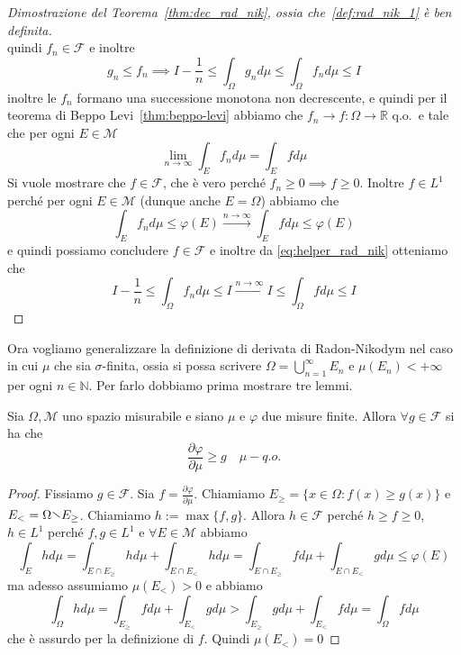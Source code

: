 \begin{proof}[Dimostrazione del Teorema~\ref{thm:dec_rad_nik}, ossia
    che~\ref{def:rad_nik_1} è ben definita]
\[    \]
    quindi \(f_{n} \in \mathcal{F}\) e inoltre 
    \begin{equation}\label{eq:helper_rad_nik}
         g_{n} \le f_{n} \implies I - \frac{1}{n} \le \int_\Omega g_{n} d\mu \le \int_\Omega f_{n}
        d\mu \le I
    \end{equation}
    inoltre le \(f_{n}\) formano una successione monotona non decrescente, e
    quindi per il teorema di Beppo Levi~\ref{thm:beppo-levi} abbiamo che \(f_{n}
    \to f : \Omega \to \mathbb{R}\) q.o.~e tale che per ogni \(E \in \mathcal{M} \) 
    \[
        \lim_{n \to \infty} \int_E f_{n} d\mu = \int_E f d\mu
    \]
    Si vuole mostrare che \(f \in \mathcal{F}\), che è
    vero perché \(f_{n} \ge 0 \implies f \ge 0\). Inoltre \(f \in L^{1}\) perché
    per ogni \(E \in \mathcal{M}\) (dunque anche \(E = \Omega\)) abbiamo che
    \[
        \int_E f_{n} d\mu \le \varphi {(E)} \overset{n \to
        \infty}{\longrightarrow} \int_E f d\mu \le \varphi {(E)}
    \]
    e quindi possiamo concludere \(f \in \mathcal{F}\) e inoltre da
    \eqref{eq:helper_rad_nik} otteniamo che
    \[
        I - \frac{1}{n} \le \int_\Omega f_{n} d\mu \le I
        \overset{n \to \infty}{\longrightarrow}I \le \int_\Omega f d\mu \le I
    \]
\end{proof}
Ora vogliamo generalizzare la definizione di derivata di Radon-Nikodym nel caso in cui
\(\mu\) che sia \(\sigma\)-finita, ossia si possa scrivere \(\Omega = \bigcup_{n=1}^{\infty}
E_{n}\) e \(\mu(E_{n}) < +\infty\) per ogni \(n \in \mathbb{N}\). Per farlo
dobbiamo prima mostrare tre lemmi.
\begin{lemma}\label{lem:rad_nik_1}
    Sia \(\Omega, \mathcal{M}\) uno spazio misurabile e siano \(\mu\) e
    \(\varphi \) due misure finite. Allora \(\forall g \in \mathcal{F}\) si ha
    che
    \[
        \frac{\partial \varphi}{\partial \mu} \ge g \quad \mu-q.o.
    \]
\end{lemma}
\begin{proof}
    Fissiamo \(g \in \mathcal{F}\). Sia \(f = \frac{\partial \varphi}{\partial \mu}\). Chiamiamo \(E_{\ge } = \{x \in \Omega :
    f {(x )} \ge g{(x)}\} \) e \(E_< = \Omega
    \sminus E_{\ge }  \). Chiamiamo \(h := \max \{f,
    g\} \). Allora \(h \in \mathcal{F}\) perché \(h \ge f\ge 0\), \(h \in
    L^{1}\) perché \(f, g \in L^{1}\) e \(\forall E \in \mathcal{M}\) abbiamo
    \[
        \int_E h d\mu = \int_{E \cap E_{\ge }} h d\mu + \int_{E \cap E_{<}} h
        d\mu = \int_{E \cap E_{\ge }} f d\mu + \int_{E \cap E_{<}} g d\mu \le \varphi
        {(E)}
    \]
    ma adesso assumiamo \(\mu{(E_<)} > 0\) e abbiamo
    \[
        \int_\Omega h d\mu = \int_{E_{\ge }} f d\mu + \int_{E_{<}} g d\mu >
        \int_{E_{\ge } } g d\mu + \int_{E_{<}} f d\mu = \int_\Omega f d\mu
    \]
    che è assurdo per la definizione di \(f\). Quindi \(\mu{(E_<)} = 0\)
\end{proof}

